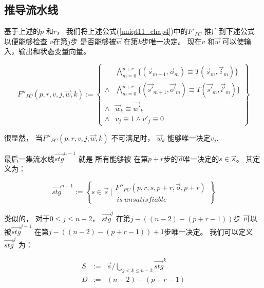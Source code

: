 \subsection{推导流水线}\label{subsec_inferstage}

基于上述的$p$ 和$r$，
我们将上述公式(\ref{uniqt11_chap4})中的$F'_{PC}$ 推广到下述公式
以便能够检查 $v$在第$j$步
是否能够被$\vec{w}$ 在第$k$步唯一决定。
现在$v$ 和$\vec{w}$ 可以使输入，输出和状态变量向量。

\begin{equation}\label{uniqt2}
F''_{PC}(p,r,v,j,\vec{w},k):=
\left\{
\begin{array}{cc}
&\bigwedge_{m=0}^{p+r}
\{
(\vec{s}_{m+1},\vec{o}_m)\equiv T(\vec{s}_m,\vec{i}_m)
\}
\\
\wedge&\bigwedge_{m=0}^{p+r}
\{
(\vec{s'}_{m+1},\vec{o'}_m)\equiv T(\vec{s'}_m,\vec{i'}_m)
\}
\\
\wedge&\vec{w}_{k}\equiv \vec{w'}_{k} \\
\wedge& v_{j}\equiv 1 \wedge  v'_{j}\equiv 0
\end{array}
\right\}
\end{equation}

很显然，
当$F''_{PC}(p,r,v,j,\vec{w},k)$ 不可满足时，
$\vec{w}_k$ 能够唯一决定$v_j$.

最后一集流水线$\vec{stg}^{n-1}$ 就是
所有能够被
在第$p+r$步的$\vec{o}$唯一决定的$s\in \vec{s}$。
其定义为：

\begin{equation}\label{stgn_1}
 \vec{stg}^{n-1} :=
\left\{
 s\in \vec{s} ~|
\begin{array}{cc}
 F''_{PC}(p,r,
 s,p+r,
 \vec{o},p+r)\\
 ~is~unsatisfiable
\end{array}
\right\}
\end{equation}


类似的，
对于$0\le j\le n-2$，
$\vec{stg}^j$ 在第$j-((n-2)-(p+r-1))$步
可以被$\vec{stg}^{j+1}$ 在第$j-((n-2)-(p+r-1))+1$步唯一决定。
我们可以定义$\vec{stg}^j$ 为：

\begin{equation}\label{stgn_def_chap4}
\begin{array}{ccc}
S             & := & \vec{s}/\bigcup_{j<k\le n-2}\vec{stg}^{k}\\
D             & := & (n-2)-(p+r-1)\\
\end{array}
\end{equation}

